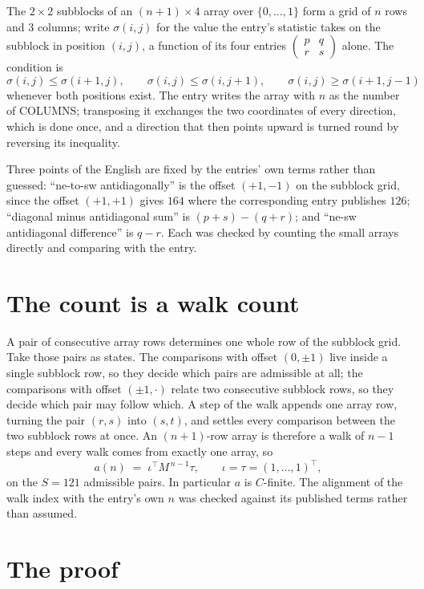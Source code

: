 \documentclass[11pt,a4paper]{article}
\theoremstyle{plain}
\theoremstyle{definition}
\begin{document}
The $2\times2$ subblocks of an $(n+1)\times4$ array over $\{0,\dots,1\}$ form a grid
of $n$ rows and $3$ columns; write $\sigma(i,j)$ for the value the entry's statistic takes on
the subblock in position $(i,j)$, a function of its four entries
$\begin{pmatrix}p&q\\r&s\end{pmatrix}$ alone. The condition is
\[
\sigma(i,j)\le\sigma(i+1,j),\qquad \sigma(i,j)\le\sigma(i,j+1),\qquad \sigma(i,j)\ge\sigma(i+1,j-1)
\]
whenever both positions exist. The entry writes the array with $n$ as the number of COLUMNS; transposing it exchanges the two coordinates of every direction, which is done once, and a direction that then points upward is turned round by reversing its inequality.

Three points of the English are fixed by the entries' own terms rather than guessed:
``ne-to-sw antidiagonally'' is the offset $(+1,-1)$ on the subblock grid, since the offset
$(+1,+1)$ gives $164$ where the corresponding entry publishes $126$; ``diagonal minus
antidiagonal sum'' is $(p+s)-(q+r)$; and ``ne-sw antidiagonal difference'' is $q-r$. Each was
checked by counting the small arrays directly and comparing with the entry.

\section{The count is a walk count}

A pair of consecutive array rows determines one whole row of the subblock grid. Take those
pairs as states. The comparisons with offset $(0,\pm1)$ live inside a single subblock row, so
they decide which pairs are admissible at all; the comparisons with offset $(\pm1,\cdot)$
relate two consecutive subblock rows, so they decide which pair may follow which. A step of the
walk appends one array row, turning the pair $(r,s)$ into $(s,t)$, and settles every comparison
between the two subblock rows at once. An $(n+1)$-row array is therefore a walk of $n-1$ steps
and every walk comes from exactly one array, so
\[
a(n)\;=\;\iota^{\!\top}M^{\,n-1}\tau,\qquad \iota=\tau=(1,\dots,1)^{\!\top},
\]
on the $S=121$ admissible pairs. In particular $a$ is $C$-finite. The alignment of the walk
index with the entry's own $n$ was checked against its published terms rather than assumed.

\section{The proof}
\end{document}
